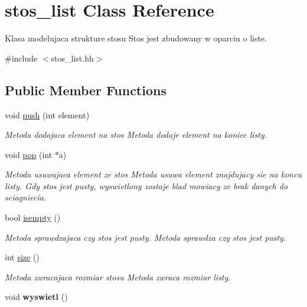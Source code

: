 \hypertarget{classstos__list}{\section{stos\-\_\-list Class Reference}
\label{classstos__list}
}


Klasa modelujaca strukture stosu Stos jest zbudowany w oparciu o liste.  




{\ttfamily \#include $<$stos\-\_\-list.\-hh$>$}

\subsection*{Public Member Functions}
\begin{DoxyCompactItemize}
\item 
void \hyperlink{classstos__list_ab42b4afb896df8c96e3d7d3368e1b6aa}{push} (int element)
\begin{DoxyCompactList}\small\item\em Metoda dodajaca element na stos Metoda dodaje element na koniec listy. \end{DoxyCompactList}\item 
void \hyperlink{classstos__list_ad29628ac4ae96bf1145930f0c2f5905e}{pop} (int $\ast$a)
\begin{DoxyCompactList}\small\item\em Metoda usuwajaca element ze stos Metoda usuwa element znajdujacy sie na koncu listy. Gdy stos jest pusty, wyswietlony zostaje blad mowiacy ze brak danych do sciagniecia. \end{DoxyCompactList}\item 
bool \hyperlink{classstos__list_acd220e524ab429fb1627f3c7b119057d}{isempty} ()
\begin{DoxyCompactList}\small\item\em Metoda sprawdzajaca czy stos jest pusty. Metoda sprawdza czy stos jest pusty. \end{DoxyCompactList}\item 
int \hyperlink{classstos__list_a221772ced817fd589be27cced0e92bb8}{size} ()
\begin{DoxyCompactList}\small\item\em Metoda zwracajaca rozmiar stosu Metoda zwraca rozmiar listy. \end{DoxyCompactList}\item 
\hypertarget{classstos__list_ab1f73a738aa290f0bcaf97e70218f04e}{void {\bfseries wyswietl} ()}\label{classstos__list_ab1f73a738aa290f0bcaf97e70218f04e}

\end{DoxyCompactItemize}



